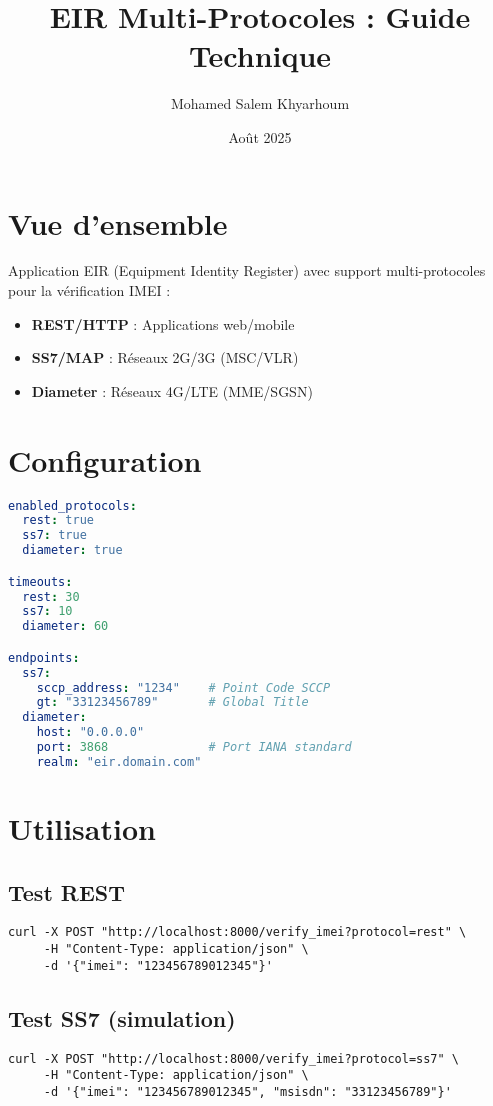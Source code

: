 \documentclass[11pt]{article}
\title{EIR Multi-Protocoles : Guide Technique}
\author{Mohamed Salem Khyarhoum}
\date{Août 2025}
\begin{document}
\maketitle

\section{Vue d'ensemble}

Application EIR (Equipment Identity Register) avec support multi-protocoles pour la vérification IMEI :
\begin{itemize}
    \item \textbf{REST/HTTP} : Applications web/mobile
    \item \textbf{SS7/MAP} : Réseaux 2G/3G (MSC/VLR)
    \item \textbf{Diameter} : Réseaux 4G/LTE (MME/SGSN)
\end{itemize}

\section{Configuration}

\begin{lstlisting}[language=yaml,caption=config/protocols.yml]
enabled_protocols:
  rest: true
  ss7: true  
  diameter: true

timeouts:
  rest: 30
  ss7: 10
  diameter: 60

endpoints:
  ss7:
    sccp_address: "1234"    # Point Code SCCP
    gt: "33123456789"       # Global Title
  diameter:
    host: "0.0.0.0"
    port: 3868              # Port IANA standard
    realm: "eir.domain.com"
\end{lstlisting}

\section{Utilisation}

\subsection{Test REST}
\begin{lstlisting}[caption=Requête REST]
curl -X POST "http://localhost:8000/verify_imei?protocol=rest" \
     -H "Content-Type: application/json" \
     -d '{"imei": "123456789012345"}'
\end{lstlisting}

\subsection{Test SS7 (simulation)}
\begin{lstlisting}[caption=Requête SS7]
curl -X POST "http://localhost:8000/verify_imei?protocol=ss7" \
     -H "Content-Type: application/json" \
     -d '{"imei": "123456789012345", "msisdn": "33123456789"}'
\end{lstlisting}
\end{document}
